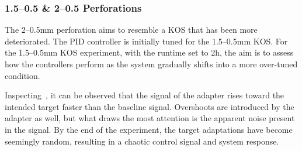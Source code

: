 %        
%        

\subsubsection{1.5--0.5 \& 2--0.5 Perforations}
The 2--0.5\si{\mm} perforation aims to resemble a KOS that has been more deteriorated.
The PID controller is initially tuned for the 1.5--0.5\si{\mm} KOS.
For the 1.5--0.5\si{\mm} KOS experiment, with the runtime set to 2\si{\hour}, the aim is to assess how the controllers perform as the system gradually shifts into a more over-tuned condition.

Inspecting~, it can be observed that the signal of the adapter rises toward the intended target faster than the baseline signal.
Overshoots are introduced by the adapter as well, but what draws the most attention is the apparent noise present in the signal.
By the end of the experiment, the target adaptations have become seemingly random, resulting in a chaotic control signal and system response.

